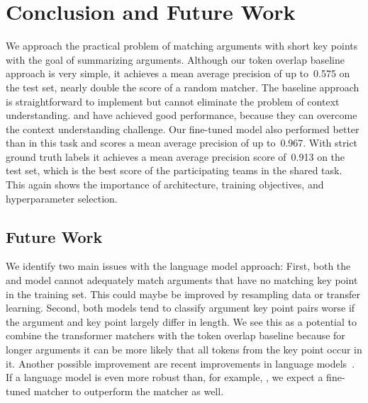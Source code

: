 \section{Conclusion and Future Work}\label{conclusion}

We approach the practical problem of matching arguments with short key points with the goal of summarizing arguments.
Although our token overlap baseline approach is very simple, it achieves a mean average precision of up to~0.575 on 
the test set, nearly double the score of a random matcher. 
The baseline approach is straightforward to implement but cannot eliminate the problem of context understanding. 
\RobertaBase and \BertBase have achieved good performance, because they can overcome the context understanding challenge. 
Our fine-tuned \RobertaBase model also performed better than \BertBase in this task and scores a mean average 
precision of up to~0.967.
With strict ground truth labels it achieves a mean average precision score of~0.913 on the test set, which is the best 
score of the participating teams in the shared task.
This again shows the importance of architecture, training objectives, and hyperparameter selection.

\subsection{Future Work}

We identify two main issues with the language model approach:
First, both the \BertBase and \RobertaBase model cannot adequately match arguments that have no matching key point in the training set.
This could maybe be improved by resampling data or transfer learning.
Second, both models tend to classify argument key point pairs worse if the argument and key point largely differ in length.
We see this as a potential to combine the transformer matchers with the token overlap baseline because for longer arguments 
it can be more likely that all tokens from the key point occur in it.
Another possible improvement are recent improvements in language models~\cite{Sun2021WFDPSLCZLLWGLSSLOYTWW}.
If a language model is even more robust than, for example, \Roberta, we expect a fine-tuned matcher to outperform 
the \RobertaBase matcher as well.

